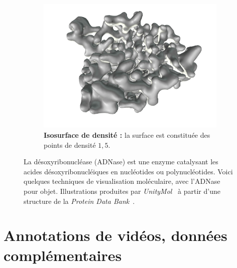 \begin{appendices}
\begin{figure}[!htbp]
\begin{subfigure}[t]{\subImgW}
		\end{subfigure}
		~
		\begin{subfigure}[t]{\subImgW}
			\centering
			\includegraphics[width=\textwidth]{./figures/ch1/4awn_iso_1_5}
			\caption[Isosurface de densité]{\textbf{Isosurface de densité :} la surface est constituée des points de densité $1,5$.}
			\label{fig:4awn_iso_1_5}
		\end{subfigure}
		\caption[Modes de représentation moléculaire]{La désoxyribonucléase (ADNase) est une enzyme catalysant les acides désoxyribonucléiques en nucléotides ou polynucléotides. Voici quelques techniques de visualisation moléculaire, avec l'ADNase pour objet. Illustrations produites par \emph{UnityMol}~\cite{doutreligne2014unitymol} à partir d'une structure de la \emph{Protein Data Bank}~\cite{parsiegla2012structure}.}
		\label{fig:4awn_atom}
	\end{figure}

\vspace*{\fill}
\clearpage
\chapter{Annotations de vidéos, données complémentaires}
\label{appendix:annexeB}


\end{appendices}
